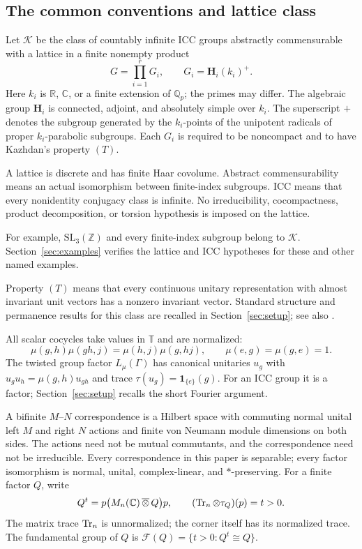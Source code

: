 \subsection{The common conventions and lattice class}
\begin{definition}\label{def:class}
Let $\mathscr K$ be the class of countably infinite ICC groups abstractly
commensurable with a lattice in a finite nonempty product
\[
 G=\prod_{i=1}^r G_i,\qquad G_i=\mathbf H_i(k_i)^+.
\]
Here $k_i$ is $\mathbb R$, $\mathbb C$, or a finite extension of
$\mathbb Q_p$; the primes may differ. The algebraic group $\mathbf H_i$ is
connected, adjoint, and absolutely simple over $k_i$. The superscript $+$
denotes the subgroup generated by the $k_i$-points of the unipotent radicals
of proper $k_i$-parabolic subgroups. Each $G_i$ is required to be noncompact
and to have Kazhdan's property $(T)$.

A lattice is discrete and has finite Haar covolume. Abstract
commensurability means an actual isomorphism between finite-index
subgroups. ICC means that every nonidentity conjugacy class is infinite.
No irreducibility, cocompactness, product decomposition, or torsion
hypothesis is imposed on the lattice.
\end{definition}

For example, $\mathrm{SL}_3(\mathbb Z)$ and every finite-index subgroup
belong to $\mathscr K$. Section~\ref{sec:examples} verifies the lattice and
ICC hypotheses for these and other named examples.

Property $(T)$ means that every continuous unitary representation with
almost invariant unit vectors has a nonzero invariant vector. Standard structure and permanence results for this class are recalled in
Section~\ref{sec:setup}; see also \cite{BHV2008}.

All scalar cocycles take values in $\mathbb T$ and are normalized:
\[
 \mu(g,h)\mu(gh,j)=\mu(h,j)\mu(g,hj),\qquad
 \mu(e,g)=\mu(g,e)=1.
\]
The twisted group factor $L_\mu(\Gamma)$ has canonical unitaries $u_g$
with $u_gu_h=\mu(g,h)u_{gh}$ and trace
$\tau(u_g)=\mathbf1_{\{e\}}(g)$. For an ICC group it is a factor; Section~\ref{sec:setup} recalls the
short Fourier argument.

A bifinite $M$--$N$ correspondence is a Hilbert space with commuting normal
unital left $M$ and right $N$ actions and finite von Neumann module
dimensions on both sides. The actions need not be mutual commutants, and
the correspondence need not be irreducible. Every correspondence in this
paper is separable; every factor isomorphism is normal, unital,
complex-linear, and $*$-preserving. For a finite factor $Q$, write
\[
 Q^t=p\bigl(M_n(\mathbb C)\,\overline\otimes\,Q\bigr)p,
 \qquad (\operatorname{Tr}_n\otimes\tau_Q)(p)=t>0.
\]
The matrix trace $\operatorname{Tr}_n$ is unnormalized; the corner itself has its
normalized trace. The fundamental group of $Q$ is
$\mathcal F(Q)=\{t>0:Q^t\cong Q\}$.

